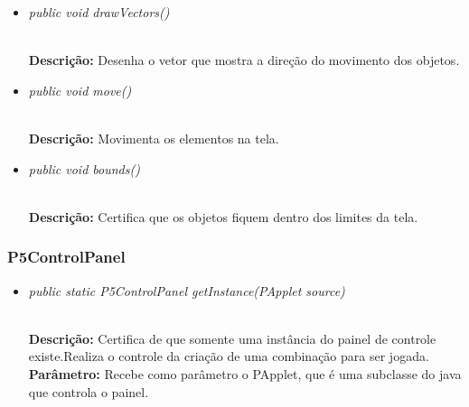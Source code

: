 \documentclass[12pt]{article}
\begin{document}
\vspace{0.2 true cm}

\begin{itemize}
\item \begin{large}\textit{public void drawVectors()}\end{large}\\
\subitem \textbf{Descrição:} Desenha o vetor que mostra a direção do movimento dos objetos.
\end{itemize}

\vspace{0.2 true cm}

\begin{itemize}
\item \begin{large}\textit{public void move()}\end{large}\\
\subitem \textbf{Descrição:} Movimenta os elementos na tela.
\end{itemize}

\vspace{0.2 true cm}

\begin{itemize}
\item \begin{large}\textit{public void bounds()}\end{large}\\
\subitem \textbf{Descrição:} Certifica que os objetos fiquem dentro dos limites da tela.
\end{itemize}

\vspace{0.2 true cm}

\subsubsection{P5ControlPanel}

\begin{itemize}
\item \begin{large}\textit{public static P5ControlPanel getInstance(PApplet source)}\end{large}\\
\subitem \textbf{Descrição:} Certifica de que somente uma instância do painel de controle existe.Realiza o controle da criação de uma combinação para ser jogada.
\subitem \textbf{Parâmetro:} Recebe como parâmetro o PApplet, que é uma subclasse do java que controla o painel.
\end{itemize}
\end{document}
